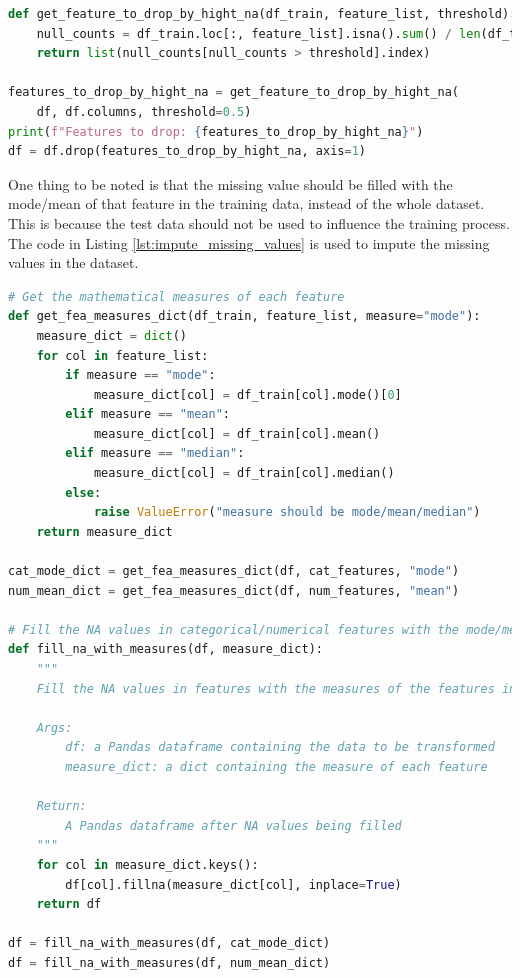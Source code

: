 \documentclass[10pt]{article}
\begin{document}
\begin{lstlisting}[language=Python, label={lst:detecting_fea_high_na}, caption={Drop the features with high amount of missing values}]
def get_feature_to_drop_by_hight_na(df_train, feature_list, threshold):
    null_counts = df_train.loc[:, feature_list].isna().sum() / len(df_train)
    return list(null_counts[null_counts > threshold].index)

features_to_drop_by_hight_na = get_feature_to_drop_by_hight_na(
    df, df.columns, threshold=0.5)
print(f"Features to drop: {features_to_drop_by_hight_na}")
df = df.drop(features_to_drop_by_hight_na, axis=1)
\end{lstlisting}

One thing to be noted is that the missing value should be filled with the mode/mean of that feature in the training data, instead of the whole dataset. This is because the test data should not be used to influence the training process. The code in Listing \ref{lst:impute_missing_values} is used to impute the missing values in the dataset.

\begin{lstlisting}[language=Python, label={lst:impute_missing_values}, caption={Fill the missing values with the measures of the feature in the training data}]
# Get the mathematical measures of each feature
def get_fea_measures_dict(df_train, feature_list, measure="mode"):
    measure_dict = dict()
    for col in feature_list:
        if measure == "mode":
            measure_dict[col] = df_train[col].mode()[0]
        elif measure == "mean":
            measure_dict[col] = df_train[col].mean()
        elif measure == "median":
            measure_dict[col] = df_train[col].median()
        else:
            raise ValueError("measure should be mode/mean/median")
    return measure_dict

cat_mode_dict = get_fea_measures_dict(df, cat_features, "mode")
num_mean_dict = get_fea_measures_dict(df, num_features, "mean")

# Fill the NA values in categorical/numerical features with the mode/mean of the features in the training dataset
def fill_na_with_measures(df, measure_dict):
    """
    Fill the NA values in features with the measures of the features in the training dataset

    Args:
        df: a Pandas dataframe containing the data to be transformed
        measure_dict: a dict containing the measure of each feature

    Return:
        A Pandas dataframe after NA values being filled
    """
    for col in measure_dict.keys():
        df[col].fillna(measure_dict[col], inplace=True)
    return df

df = fill_na_with_measures(df, cat_mode_dict)
df = fill_na_with_measures(df, num_mean_dict)
\end{lstlisting}
\end{document}
